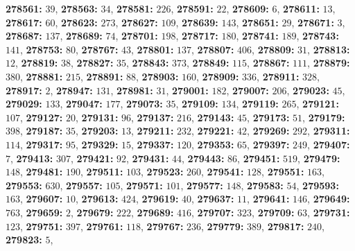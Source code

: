 \textsf{\bfseries 278561:} $39$, \textsf{\bfseries 278563:} $34$, \textsf{\bfseries 278581:} $226$, \textsf{\bfseries 278591:} $22$, \textsf{\bfseries 278609:} $6$, \textsf{\bfseries 278611:} $13$, \textsf{\bfseries 278617:} $60$, \textsf{\bfseries 278623:} $273$, \textsf{\bfseries 278627:} $109$, \textsf{\bfseries 278639:} $143$, \textsf{\bfseries 278651:} $29$, \textsf{\bfseries 278671:} $3$, \textsf{\bfseries 278687:} $137$, \textsf{\bfseries 278689:} $74$, \textsf{\bfseries 278701:} $198$, \textsf{\bfseries 278717:} $180$, \textsf{\bfseries 278741:} $189$, \textsf{\bfseries 278743:} $141$, \textsf{\bfseries 278753:} $80$, \textsf{\bfseries 278767:} $43$, \textsf{\bfseries 278801:} $137$, \textsf{\bfseries 278807:} $406$, \textsf{\bfseries 278809:} $31$, \textsf{\bfseries 278813:} $12$, \textsf{\bfseries 278819:} $38$, \textsf{\bfseries 278827:} $35$, \textsf{\bfseries 278843:} $373$, \textsf{\bfseries 278849:} $115$, \textsf{\bfseries 278867:} $111$, \textsf{\bfseries 278879:} $380$, \textsf{\bfseries 278881:} $215$, \textsf{\bfseries 278891:} $88$, \textsf{\bfseries 278903:} $160$, \textsf{\bfseries 278909:} $336$, \textsf{\bfseries 278911:} $328$, \textsf{\bfseries 278917:} $2$, \textsf{\bfseries 278947:} $131$, \textsf{\bfseries 278981:} $31$, \textsf{\bfseries 279001:} $182$, \textsf{\bfseries 279007:} $206$, \textsf{\bfseries 279023:} $45$, \textsf{\bfseries 279029:} $133$, \textsf{\bfseries 279047:} $177$, \textsf{\bfseries 279073:} $35$, \textsf{\bfseries 279109:} $134$, \textsf{\bfseries 279119:} $265$, \textsf{\bfseries 279121:} $107$, \textsf{\bfseries 279127:} $20$, \textsf{\bfseries 279131:} $96$, \textsf{\bfseries 279137:} $216$, \textsf{\bfseries 279143:} $45$, \textsf{\bfseries 279173:} $51$, \textsf{\bfseries 279179:} $398$, \textsf{\bfseries 279187:} $35$, \textsf{\bfseries 279203:} $13$, \textsf{\bfseries 279211:} $232$, \textsf{\bfseries 279221:} $42$, \textsf{\bfseries 279269:} $292$, \textsf{\bfseries 279311:} $114$, \textsf{\bfseries 279317:} $95$, \textsf{\bfseries 279329:} $15$, \textsf{\bfseries 279337:} $120$, \textsf{\bfseries 279353:} $65$, \textsf{\bfseries 279397:} $249$, \textsf{\bfseries 279407:} $7$, \textsf{\bfseries 279413:} $307$, \textsf{\bfseries 279421:} $92$, \textsf{\bfseries 279431:} $44$, \textsf{\bfseries 279443:} $86$, \textsf{\bfseries 279451:} $519$, \textsf{\bfseries 279479:} $148$, \textsf{\bfseries 279481:} $190$, \textsf{\bfseries 279511:} $103$, \textsf{\bfseries 279523:} $260$, \textsf{\bfseries 279541:} $128$, \textsf{\bfseries 279551:} $163$, \textsf{\bfseries 279553:} $630$, \textsf{\bfseries 279557:} $105$, \textsf{\bfseries 279571:} $101$, \textsf{\bfseries 279577:} $148$, \textsf{\bfseries 279583:} $54$, \textsf{\bfseries 279593:} $163$, \textsf{\bfseries 279607:} $10$, \textsf{\bfseries 279613:} $424$, \textsf{\bfseries 279619:} $40$, \textsf{\bfseries 279637:} $11$, \textsf{\bfseries 279641:} $146$, \textsf{\bfseries 279649:} $763$, \textsf{\bfseries 279659:} $2$, \textsf{\bfseries 279679:} $222$, \textsf{\bfseries 279689:} $416$, \textsf{\bfseries 279707:} $323$, \textsf{\bfseries 279709:} $63$, \textsf{\bfseries 279731:} $123$, \textsf{\bfseries 279751:} $397$, \textsf{\bfseries 279761:} $118$, \textsf{\bfseries 279767:} $236$, \textsf{\bfseries 279779:} $389$, \textsf{\bfseries 279817:} $240$, \textsf{\bfseries 279823:} $5$, 
